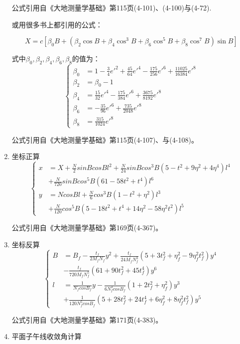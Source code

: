 \begin{enumerate}
公式引用自《大地测量学基础》第115页(4-101)、(4-100)与(4-72).

或用很多书上都引用的公式：

\[ X=c[\beta_0 B + (\beta_2 \cos B + \beta_4 \cos^3 B + \beta_6 \cos^5 B + \beta_8 \cos^7 B) \sin B] \]

式中$\beta_0, \beta_2, \beta_4, \beta_6, \beta_8$的值为：
\[
\left \{ \begin{aligned}
\beta_0 &= 1 - \frac{3}{4}e'^2 + \frac{45}{64}e'^4 - \frac{175}{256}e'^6 + \frac{11025}{16384}e'^8  \\
\beta_2 &= \beta_0 -1  \\
\beta_4 &= \frac{15}{32}e'^4 - \frac{175}{384}e'^6 + \frac{3675}{8192}e'^8   \\
\beta_6 &= -\frac{35}{96}e'^6 + \frac{735}{2048}e'^8   \\
\beta_8 &= \frac{315}{1024}e'^8
\end{aligned} \right.  
\]

公式引用自《大地测量学基础》第115页(4-107)、与(4-108)。

\item 坐标正算
\[
\left \{ \begin{aligned}
x&=X+\frac{N}{2}sinBcosBl^2 +\frac{N}{24}sinBcos^3B(5-t^2 +9\eta^2+4\eta^4)l^4 \\
  &+\frac{N}{720}sinBcos^5 B(61-58t^2 +t^4)l^6  \\
y&=NcosBl+\frac{N}{6}cos^3 B(1-t^2 +\eta^2 )l^3 \\
        &+\frac{N}{120}cos^5 B (5-18t^2+t^4 +14\eta^2 -58\eta^2t^2)l^5
\end{aligned} \right.
\]


公式引用自《大地测量学基础》第169页(4-367)。

\item 坐标反算
\[
\left \{ \begin{aligned}
B&=B_f - \frac{t_f}{2M_f N_f }y^2 +\frac{t_f}{24 M_f N_f ^3}
(5 + 3t_f ^2  + \eta_f ^2 - 9\eta_f ^2 t_f^2)y^4 \\
 &- \frac{t_f}{720 M_f N_f ^5}(61 + 90t_f ^2 + 45t_f ^4)y^6 \\
l&=\frac{1}{N_f cosB_f}y - \frac{1}{6N_f ^3 cosB_f}(1 + 2t_f ^2 + \eta_f ^2)y^3  \\
 &+ \frac{1}{120N_f ^5 cosB_f}(5 + 28t_f ^2 + 24t_f ^4 + 6\eta_f ^2 +8\eta_f ^2 t_f ^2)y^5
\end{aligned} \right.
\]

公式引用自《大地测量学基础》第171页(4-383)。


\item 平面子午线收敛角计算


\end{enumerate}
